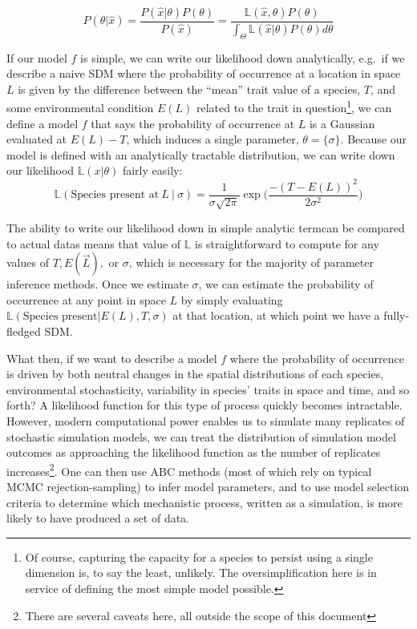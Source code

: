 \documentclass[]{article}
\begin{document}
\[ P(\theta | \hat{x}) = \frac{P(\hat{x} | \theta)  P(\theta)}{P(\hat{x})} = \frac{\mathbb{L}(\hat{x}, \theta)  P(\theta)}{\int_\Theta \mathbb{L}(\hat{x} | \theta) P(\theta) d\theta}\]

If our model \(f\) is simple, we can write our likelihood down
analytically, e.g.~if we describe a naive SDM where the probability of
occurrence at a location in space \(L\) is given by the difference
between the ``mean'' trait value of a species, \(T\), and some
environmental condition \(E({L})\) related to the trait in
question\footnote{Of course, capturing the capacity for a species to
  persist using a single dimension is, to say the least, unlikely. The
  oversimplification here is in service of defining the most simple
  model possible.}, we can define a model \(f\) that says the
probability of occurrence at \({L}\) is a Gaussian evaluated at
\(E({L}) - T\), which induces a single parameter,
\(\theta = \{ \sigma \}\). Because our model is defined with an
analytically tractable distribution, we can write down our likelihood
\(\mathbb{L}(x | \theta)\) fairly easily:
\[\mathbb{L}(\text{Species present at} \ {L} \ |\  \sigma) = \frac{1}{\sigma \sqrt{2\pi}} \exp \Big( \frac{-(T-E({L}))^2}{2\sigma^2} \Big)\]

The ability to write our likelihood down in simple analytic termcan be compared to actual datas means
that value of \(\mathbb{L}\) is straightforward to compute for any
values of \(T, E(\vec{L}),\) or \(\sigma\), which is necessary for the
majority of parameter inference methods. Once we estimate \(\sigma\), we
can estimate the probability of occurrence at any point in space \(L\)
by simply evaluating
\(\mathbb{L}(\text{Species present} | E(L) , T, \sigma)\) at that
location, at which point we have a fully-fledged SDM.

What then, if we want to describe a model \(f\) where the probability of
occurrence is driven by both neutral changes in the spatial
distributions of each species, environmental stochasticity, variability
in species' traits in space and time, and so forth? A likelihood
function for this type of process quickly becomes intractable. However,
modern computational power enables us to simulate many replicates of
stochastic simulation models, we can treat the distribution of
simulation model outcomes as approaching the likelihood function as the
number of replicates increases\footnote{There are several caveats here,
  all outside the scope of this document}. One can then use ABC methods
(most of which rely on typical MCMC rejection-sampling) to infer model
parameters, and to use model selection criteria to determine which
mechanistic process, written as a simulation, is more likely to have
produced a set of data.
\end{document}
